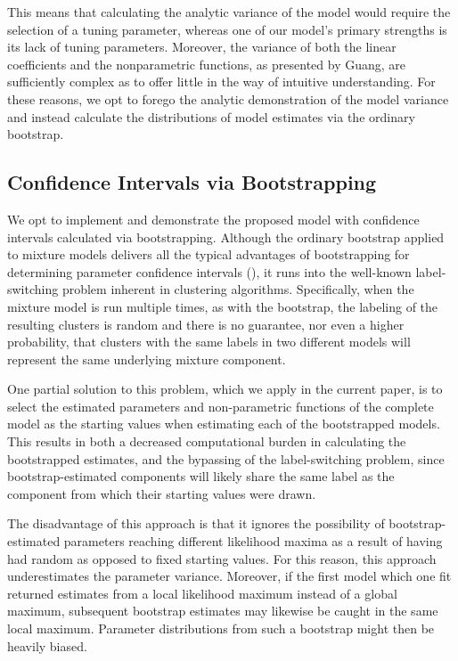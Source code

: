\documentclass[10pt]{olplainarticle}\usepackage[]{graphicx}\usepackage[]{color}
\begin{document}
This means that calculating the analytic variance of the model would require the selection of a tuning parameter, whereas one of our model's primary strengths is its lack of tuning parameters. Moreover, the variance of both the linear coefficients and the nonparametric functions, as presented by Guang, are sufficiently complex as to offer little in the way of intuitive understanding. For these reasons, we opt to forego the analytic demonstration of the model variance and instead calculate the distributions of model estimates via the ordinary bootstrap.


\subsection{Confidence Intervals via Bootstrapping}

We opt to implement and demonstrate the proposed model with confidence intervals calculated via bootstrapping. Although the ordinary bootstrap applied to mixture models delivers all the typical advantages of bootstrapping for determining parameter confidence intervals (\cite{efron}), it runs into the well-known label-switching problem inherent in clustering algorithms. Specifically, when the mixture model is run multiple times, as with the bootstrap, the labeling of the resulting clusters is random and there is no guarantee, nor even a higher probability, that clusters with the same labels in two different models will represent the same underlying mixture component.

One partial solution to this problem, which we apply in the current paper, is to select the estimated parameters and non-parametric functions of the complete model as the starting values when estimating each of the bootstrapped models. This results in both a decreased computational burden in calculating the bootstrapped estimates, and the bypassing of the label-switching problem, since bootstrap-estimated components will likely share the same label as the component from which their starting values were drawn.

The disadvantage of this approach is that it ignores the possibility of bootstrap-estimated parameters reaching different likelihood maxima as a result of having had random as opposed to fixed starting values. For this reason, this approach underestimates the parameter variance. Moreover, if the first model which one fit returned estimates from a local likelihood maximum instead of a global maximum, subsequent bootstrap estimates may likewise be caught in the same local maximum. Parameter distributions from such a bootstrap might then be heavily biased.
\end{document}
